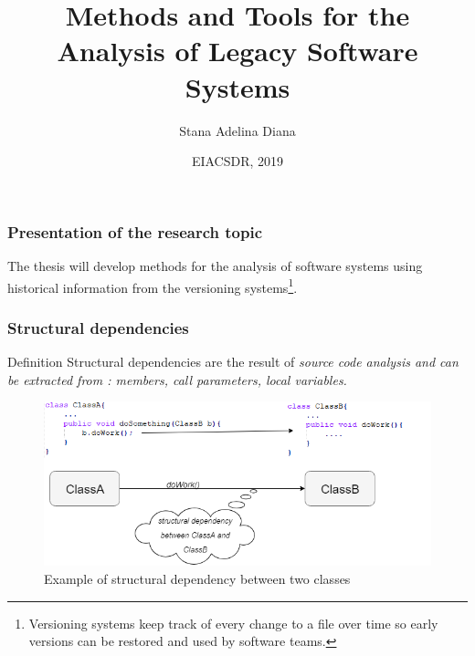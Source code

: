 \documentclass{beamer}
\title[Pres]{Methods and Tools for the Analysis of Legacy Software Systems}
\author{Stana Adelina Diana}
\institute{Computer Science and Engineering Department\\
"Politehnica" University of Timisoara}
\date{EIACSDR, 2019}
\begin{document}
\begin{frame}
  \titlepage
\end{frame}


 \begin{frame}
\frametitle{Presentation of the research topic}
 The thesis will develop methods for the analysis of software systems
 using historical information from the versioning systems\footnote{Versioning systems keep track of every change to a file over time so early versions can be restored and used by software teams.}. 
\end{frame}


 \begin{frame}
\frametitle{Structural dependencies}
\begin{block}{Definition}
Structural dependencies are the result of \it{source code analysis} and can be extracted from : members, call parameters, local variables. 
\end{block}

\begin{center}
     \begin{figure}
	\includegraphics[width=\textwidth]{structural_dep.png}
	\caption{\label{fig:fig}Example of structural dependency between two classes}
     \end{figure}
\end{center}

\end{frame}

\end{document}
